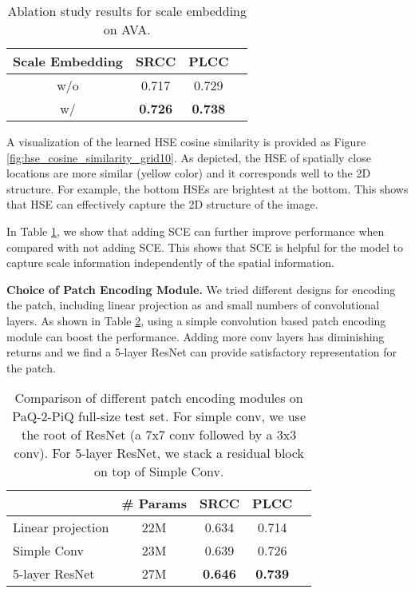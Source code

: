 \begin{table}[!tp]
\footnotesize
\begin{center}
\begin{tabular}{cccc}\toprule
Scale Embedding &SRCC &PLCC \\\midrule
w/o &0.717 &0.729 \\
w/ &\textbf{0.726} &\textbf{0.738} \\
\bottomrule
\end{tabular}
\end{center}
\vspace{-2mm}
\caption{Ablation study results for scale embedding on AVA.}\label{tab:scale-emb}
\vspace{-2mm}
\end{table}

A visualization of the learned HSE cosine similarity is provided as Figure \ref{fig:hse_cosine_similarity_grid10}. As depicted, the HSE of spatially close locations are more similar (yellow color) and it corresponds well to the 2D structure. For example, the bottom HSEs are brightest at the bottom. This shows that HSE can effectively capture the 2D structure of the image.

In Table \ref{tab:scale-emb}, we show that adding SCE can further improve performance when compared with not adding SCE. This shows that SCE is helpful for the model to capture scale information independently of the spatial information.


\noindent\textbf{Choice of Patch Encoding Module.} We tried different designs for encoding the patch, including linear projection as \cite{dosovitskiy2020} and small numbers of convolutional layers. As shown in Table \ref{tab:patch-encoding}, using a simple convolution based patch encoding module can boost the performance. Adding more conv layers has diminishing returns and we find a 5-layer ResNet can provide satisfactory representation for the patch.



\begin{table}[!tp]
\footnotesize
\begin{center}
\begin{tabular}{lcccc}\toprule
&\# Params &SRCC &PLCC \\\midrule
Linear projection &22M &0.634 &0.714 \\
Simple Conv &23M &0.639 &0.726 \\
5-layer ResNet &27M &\textbf{0.646} &\textbf{0.739} \\
\bottomrule
\end{tabular}
\end{center}
\vspace{-2mm}
\caption{Comparison of different patch encoding modules on PaQ-2-PiQ full-size test set. For simple conv, we use the root of ResNet (a 7x7 conv followed by a 3x3 conv). For 5-layer ResNet, we stack a residual block on top of Simple Conv.}\label{tab:patch-encoding}
\vspace{-3mm}
\end{table}
